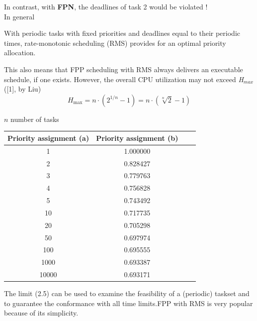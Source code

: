In contrast, with \textbf{FPN}, the deadlines of task 2 would be violated !\\

In general

\begin{tcolorbox}[colback=blue!5!white,colframe=blue!75!black]
 	With periodic tasks with fixed priorities and deadlines equal to their periodic times, rate-monotonic scheduling (RMS) provides for an optimal priority allocation.
\end{tcolorbox}

This also means that FPP scheduling with RMS always delivers an executable schedule, if one exists. However, the overall CPU utilization may not exceed \textit{H${}_{max}$ }([1], by Liu)\\

\begin{equation}
	H_{\max } =n\cdot \left(2^{1/n} -1\right)=n\cdot \left(\sqrt[{n}]{2} -1\right) 
\label{EQ }
\end{equation}

$n$ number of tasks\\

\begin{table}[h!]
\setlength{\tabcolsep}{10pt} %
\renewcommand{\arraystretch}{1.5} %
\small
\centering
 \begin{tabular}{|c|c|c|c|} 
 \hline
 \textbf{Priority assignment (a)} & \textbf{Priority assignment (b)} \\ [0.1ex] \hline
1 & 1.000000 \\ \hline
2 & 0.828427 \\ \hline
3 & 0.779763 \\  \hline
4 & 0.756828 \\ \hline
5 & 0.743492 \\ \hline
10 & 0.717735 \\ \hline 
20 & 0.705298 \\ \hline 
50 & 0.697974 \\ \hline 
100 & 0.695555 \\ \hline 
1000 & 0.693387 \\ \hline 
10000 & 0.693171 \\ \hline 
 \end{tabular}
 \label{}
\end{table}

The limit (2.5) can be used to examine the feasibility of a (periodic) taskset and to guarantee the conformance with all time limits.FPP with RMS is very popular because of its simplicity. \\

